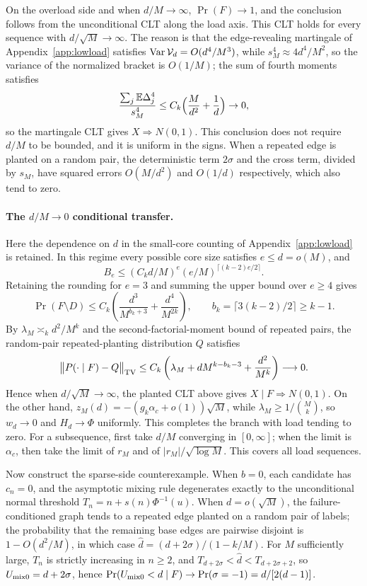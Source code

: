 On the overload side and when $d/M\to\infty$, $\Pr(F)\to1$, and the conclusion follows from the
unconditional CLT along the load axis. This CLT holds for every sequence with
$d/\sqrt M\to\infty$. The reason is that the edge-revealing martingale of Appendix~\ref{app:lowload}
satisfies $\operatorname{Var}\mathcal V_d=O(d^4/M^3)$, while $s_M^4\approx4d^4/M^2$, so the variance of the
normalized bracket is $O(1/M)$; the sum of fourth moments satisfies
\begin{equation*}
\frac{\sum_j\mathbb E\Delta_j^4}{s_M^4}\le C_k\Bigl(\frac M{d^2}+\frac1d\Bigr)\to0,
\end{equation*}
so the martingale CLT gives $X\Rightarrow N(0,1)$. This conclusion does not require $d/M$ to be
bounded, and it is uniform in the signs. When a repeated edge is planted on a random pair, the
deterministic term $2\sigma$ and the cross term, divided by $s_M$, have squared errors
$O(M/d^2)$ and $O(1/d)$ respectively, which also tend to zero.

\paragraph{The $d/M\to0$ conditional transfer.} Here the dependence on $d$ in the small-core
counting of Appendix~\ref{app:lowload} is retained. In this regime every possible core size
satisfies $e\le d=o(M)$, and
\[
B_e\le(C_kd/M)^e(e/M)^{\lceil(k-2)e/2\rceil}.
\]
Retaining the rounding for $e=3$ and summing the upper bound over $e\ge4$ gives
\[
\Pr(F\setminus D)\le C_k\left(\frac{d^3}{M^{b_k+3}}+\frac{d^4}{M^{2k}}\right),
\qquad b_k=\lceil3(k-2)/2\rceil\ge k-1.
\]
By $\lambda_M\asymp_k d^2/M^k$ and the second-factorial-moment bound of repeated pairs, the
random-pair repeated-planting distribution $Q$ satisfies
\[
\bigl\|P(\cdot\mid F)-Q\bigr\|_{\rm TV}
\le C_k\left(\lambda_M+dM^{k-b_k-3}+\frac{d^2}{M^k}\right)\longrightarrow0.
\]
Hence when $d/\sqrt M\to\infty$, the planted CLT above gives $X\mid F\Rightarrow N(0,1)$. On the
other hand, $z_M(d)=-(g_k\alpha_c+o(1))\sqrt M$, while $\lambda_M\ge1/\binom Mk$, so $w_d\to0$
and $H_d\to\Phi$ uniformly. This completes the branch with load tending to zero. For a
subsequence, first take $d/M$ converging in $[0,\infty]$; when the limit is $\alpha_c$, then take
the limit of $r_M$ and of $|r_M|/\sqrt{\log M}$. This covers all load sequences.

Now construct the sparse-side counterexample. When $b=0$, each candidate has $c_n=0$, and the
asymptotic mixing rule degenerates exactly to the unconditional normal threshold
$T_n=n+s(n)\Phi^{-1}(u)$. When $d=o(\sqrt M)$, the failure-conditioned graph tends to a repeated
edge planted on a random pair of labels; the probability that the remaining base edges are pairwise
disjoint is $1-O(d^2/M)$, in which case $\widehat d=(d+2\sigma)/(1-k/M)$. For $M$ sufficiently
large, $T_n$ is strictly increasing in $n\ge2$, and
$T_{d+2\sigma}<\widehat d<T_{d+2\sigma+2}$, so $U_{\rm mix0}=d+2\sigma$, hence
$\Pr(U_{\rm mix0}<d\mid F)\to\Pr(\sigma=-1)=d/[2(d-1)]$.
